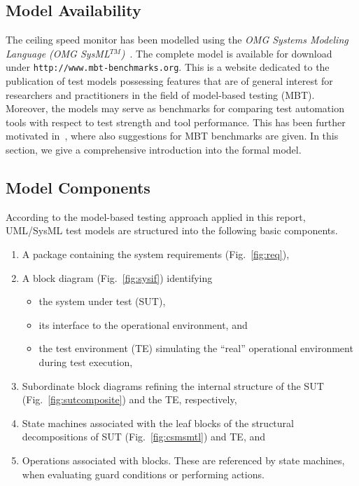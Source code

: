 \subsection{Model Availability} 


The ceiling speed monitor has been modelled using the {\it OMG Systems Modeling Language (OMG SysML$^{TM}$)}~\cite{SysML12}. 
The complete   model   is available for download under {\tt http://www.mbt-benchmarks.org}. This is a website dedicated to the publication of test models possessing features that are of general interest for researchers and practitioners in the field of model-based testing (MBT). Moreover, the models may serve as benchmarks for comparing test automation tools with respect to test strength and tool performance. This has been further motivated in~\cite{pel2011a}, where also suggestions for MBT benchmarks are given.
In this section, we give a comprehensive introduction into the formal model.


\subsection{Model Components} 

According to the model-based testing approach applied in this report, UML/SysML test models are 
structured into the following basic components.
\begin{enumerate}
\item A package containing the system requirements (Fig.~\ref{fig:req}),
\item A block diagram  (Fig.~\ref{fig:sysif}) identifying 
\begin{itemize}
\item the system under test (SUT),
\item its interface to the operational environment, and
\item the test environment (TE) simulating the ``real'' operational environment during test execution,
\end{itemize}
\item Subordinate block diagrams refining the internal structure of the SUT (Fig.~\ref{fig:sutcomposite}) and the TE, respectively, 
\item State machines associated with the leaf blocks of the structural decompositions of SUT (Fig.~\ref{fig:csmsmtl}) and TE, and
\item Operations associated with blocks. These are referenced by state machines, when evaluating guard conditions or performing actions.
\end{enumerate}



